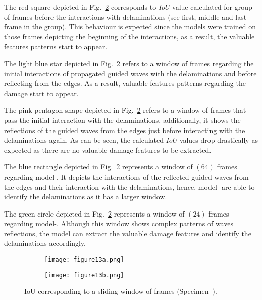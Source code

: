The red square depicted in Fig.~\ref{fig:L3_S4_B_333x333p_50kHz_5HC_shapes_} corresponds to \(IoU\) value calculated for group of frames before the interactions with delaminations (see first, middle and last frame in the group).
This behaviour is expected since the models were trained on those frames depicting the beginning of the interactions, as a result, the valuable features patterns start to appear.

The light blue star depicted in Fig.~\ref{fig:L3_S4_B_333x333p_50kHz_5HC_shapes_} refers to a window of frames regarding the initial interactions of propagated guided waves with the delaminations and before reflecting from the edges.
As a result, valuable features patterns regarding the damage start to appear.

The pink pentagon shape depicted in Fig.~\ref{fig:L3_S4_B_333x333p_50kHz_5HC_shapes_} refers to a window of frames that pass the initial interaction with the delaminations, additionally, it shows the reflections of the guided waves from the edges just before interacting with the delaminations again.
As can be seen, the calculated \(IoU\) values drop drastically as expected as there are no valuable damage features to be extracted. 

The blue rectangle depicted in Fig.~\ref{fig:L3_S4_B_333x333p_50kHz_5HC_shapes_} represents a window of \((64)\) frames regarding model-.
It depicts the interactions of the reflected guided waves from the edges and their interaction with the delaminations, hence, model- are able to identify the delaminations as it has a larger window.

The green circle depicted in Fig.~\ref{fig:L3_S4_B_333x333p_50kHz_5HC_shapes_} represents a window of \((24)\) frames regarding model-.
Although this window shows complex patterns of waves reflections, the model can extract the valuable damage features and identify the delaminations accordingly.
\begin{figure} [!h]
	\centering
	\begin{subfigure}[b]{1\textwidth}
		\centering
		\texttt{[image: figure13a.png]}
		\caption{}
		\label{fig:L3_S4_B_333x333p_50kHz_5HC_IoU}
	\end{subfigure}
	\par\medskip
	\begin{subfigure}[b]{1\textwidth}
		\centering
		\texttt{[image: figure13b.png]}
		\caption{} 
		\label{fig:L3_S4_B_333x333p_50kHz_5HC_shapes_}
	\end{subfigure}
	\caption{IoU corresponding to a sliding window of frames (Specimen~).}
	\label{fig:L3_S4_B_333x333p_50kHz_5HC_IoU_centre_window}
\end{figure} 

